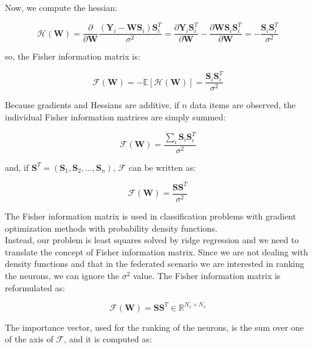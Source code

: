 Now, we compute the hessian:

\begin{equation}
    \mathcal{H}(\textbf{W})=\frac{\partial}{\partial\textbf{W}}\frac{(\textbf{Y}_i-\textbf{WS}_i)\textbf{S}_i^T}{\sigma^2}=\frac{\partial\textbf{Y}_i\textbf{S}_i^T}{\partial\textbf{W}}-\frac{\partial\textbf{WS}_i\textbf{S}_i^T}{\partial\textbf{W}}=-\frac{\textbf{S}_i\textbf{S}_i^T}{\sigma^2}
\end{equation}

so, the Fisher information matrix is:

\begin{equation}
    \mathcal{F}(\textbf{W})=-\mathbb{E}\left[ \mathcal{H}(\textbf{W}) \right]=\frac{\textbf{S}_i\textbf{S}_i^T}{\sigma^2}
\end{equation}

Because gradients and Hessians are additive, if $n$ data items are observed, the individual Fisher information matrices are simply summed:

\begin{equation}
    \mathcal{F}(\textbf{W})=\frac{\sum_i{\textbf{S}_i\textbf{S}_i^T}}{\sigma^2}
\end{equation}

and, if $\textbf{S}^T=(\textbf{S}_1, \textbf{S}_2,\dots,\textbf{S}_n)$, $\mathcal{F}$ can be written as:

\begin{equation}
    \mathcal{F}(\textbf{W})=\frac{\textbf{S}\textbf{S}^T}{\sigma^2}
\end{equation}

The Fisher information matrix is used in classification problems with gradient optimization methods with probability density functions.\\

Instead, our problem is least squares solved by ridge regression and we need to translate the concept of Fisher information matrix. Since we are not dealing with density functions and that in the federated scenario we are interested in ranking the neurons, we can ignore the $\sigma^2$ value. The Fisher information matrix is reformulated as:

\begin{equation}\label{eq:sst}
    \mathcal{F}(\textbf{W})=\textbf{SS}^T\in\mathbb{R}^{N_x\times N_x}
\end{equation}

The importance vector, used for the ranking of the neurons, is the sum over one of the axis of $\mathcal{F}$, and it is computed as:


